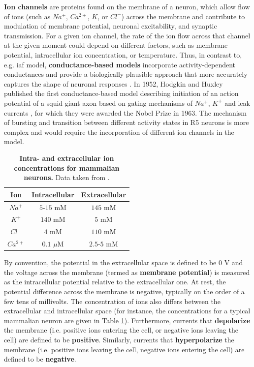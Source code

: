 \documentclass[../main.tex]{subfiles}
\begin{document}
\textbf{Ion channels} are proteins found on the membrane of a neuron, which allow flow of ions (such as $Na^+$, $Ca^{2+}$, $K$, or $Cl^-$) across the membrane and contribute to modulation of membrane potential, neuronal excitability, and synaptic transmission. For a given ion channel, the rate of the ion flow across that channel at the given moment could depend on different factors, such as membrane potential, intracellular ion concentration, or temperature. Thus, in contrast to, e.g. \gls{iaf} model, \textbf{conductance-based models} incorporate activity-dependent conductances and provide a biologically plausible approach that more accurately captures the shape of neuronal responses \cite{destexheConductanceBasedIntegrateandFireModels1997}. In 1952, Hodgkin and Huxley published the first conductance-based model describing initiation of an action potential of a squid giant axon based on gating mechanisms of $Na^{+}$, $K^+$ and leak currents \cite{hodgkinQuantitativeDescriptionMembrane1952}, for which they were awarded the Nobel Prize in 1963. The mechanism of bursting and transition between different activity states in R5 neurons is more complex and would require the incorporation of different ion channels in the model.

\begin{table}[!b]
    \centering
    \begin{tabular}{|c|c|c|}
        \hline
        Ion & Intracellular & Extracellular \\
        \hline
        \hline
        $Na^+$     & $5$-$15$ mM    & $145$ mM    \\
        $K^+$      & $140$ mM       & $5$ mM      \\
        $Cl^-$     & $4$ mM         & $110$ mM    \\
        $Ca^{2+}$  & $0.1$ $\mu$M   & $2.5$-$5$ mM \\
        \hline
    \end{tabular}
    \caption[Intra- and extracellular ion concentrations for mammalian neurons]{
        \textbf{Intra- and extracellular ion concentrations for mammalian neurons.}
        Data taken from \cite{izhikevichDynamicalSystemsNeuroscience2006}.
    }
    \label{tab:typical_ion_concentrations_in_mammaly}
\end{table}

By convention, the potential in the extracellular space is defined to be $0$ V and the voltage across the membrane (termed as \textbf{membrane potential}) is measured as the intracellular potential relative to the extracellular one. At rest, the potential difference across the membrane is negative, typically on the order of a few tens of millivolts. The concentration of ions also differs between the extracellular and intracellular space (for instance, the concentrations for a typical mammalian neuron are given in Table \ref{tab:typical_ion_concentrations_in_mammaly}). Furthermore, currents that \textbf{depolarize} the membrane (i.e. positive ions entering the cell, or negative ions leaving the cell) are defined to be \textbf{positive}. Similarly, currents that \textbf{hyperpolarize} the membrane (i.e. positive ions leaving the cell, negative ions entering the cell) are defined to be \textbf{negative}.
\end{document}
